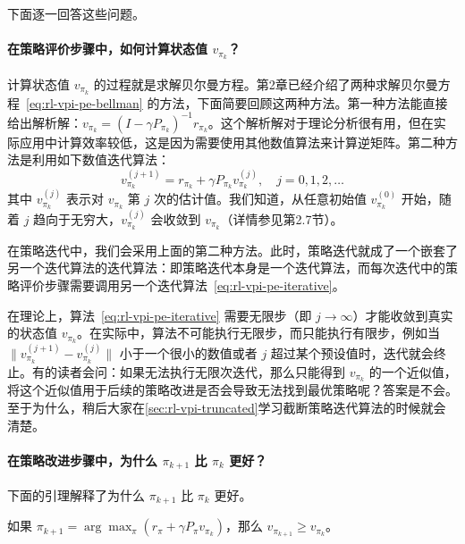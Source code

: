 下面逐一回答这些问题。

\paragraph{在策略评价步骤中，如何计算状态值 $v_{\pi_{k}}$？}

计算状态值 $v_{\pi_{k}}$ 的过程就是求解贝尔曼方程。第2章已经介绍了两种求解贝尔曼方程~\eqref{eq:rl-vpi-pe-bellman} 的方法，下面简要回顾这两种方法。第一种方法能直接给出解析解：$v_{\pi_{k}} = (I - \gamma P_{\pi_{k}})^{-1} r_{\pi_{k}}$。这个解析解对于理论分析很有用，但在实际应用中计算效率较低，这是因为需要使用其他数值算法来计算逆矩阵。第二种方法是利用如下数值迭代算法：
\begin{equation}
\label{eq:rl-vpi-pe-iterative}
v_{\pi_{k}}^{(j+1)} = r_{\pi_{k}} + \gamma P_{\pi_{k}} v_{\pi_{k}}^{(j)}, \quad j = 0, 1, 2, \ldots
\end{equation}
其中 $v_{\pi_{k}}^{(j)}$ 表示对 $v_{\pi_{k}}$ 第 $j$ 次的估计值。我们知道，从任意初始值 $v_{\pi_{k}}^{(0)}$ 开始，随着 $j$ 趋向于无穷大，$v_{\pi_{k}}^{(j)}$ 会收敛到 $v_{\pi_{k}}$（详情参见第2.7节）。

在策略迭代中，我们会采用上面的第二种方法。此时，策略迭代就成了一个嵌套了另一个迭代算法的迭代算法：即策略迭代本身是一个迭代算法，而每次迭代中的策略评价步骤需要调用另一个迭代算法~\eqref{eq:rl-vpi-pe-iterative}。

在理论上，算法~\eqref{eq:rl-vpi-pe-iterative} 需要无限步（即 $j \to \infty$）才能收敛到真实的状态值 $v_{\pi_{k}}$。在实际中，算法不可能执行无限步，而只能执行有限步，例如当 $\|v_{\pi_{k}}^{(j+1)} - v_{\pi_{k}}^{(j)}\|$ 小于一个很小的数值或者 $j$ 超过某个预设值时，迭代就会终止。有的读者会问：如果无法执行无限次迭代，那么只能得到 $v_{\pi_{k}}$ 的一个近似值，将这个近似值用于后续的策略改进是否会导致无法找到最优策略呢？答案是不会。至于为什么，稍后大家在\cref{sec:rl-vpi-truncated}学习截断策略迭代算法的时候就会清楚。

\paragraph{在策略改进步骤中，为什么 $\pi_{k+1}$ 比 $\pi_{k}$ 更好？}

下面的引理解释了为什么 $\pi_{k+1}$ 比 $\pi_{k}$ 更好。

\begin{lemma}[策略改进]\label{lem:rl-vpi-policy-improvement}
如果 $\pi_{k+1} = \arg\max_{\pi}(r_{\pi} + \gamma P_{\pi} v_{\pi_{k}})$，那么 $v_{\pi_{k+1}} \geqslant v_{\pi_{k}}$。
\end{lemma}

